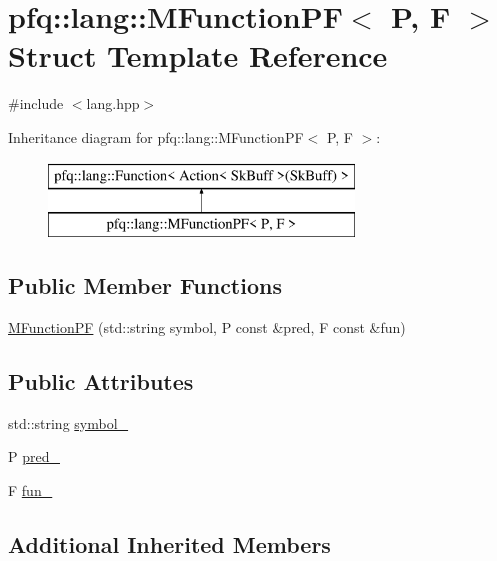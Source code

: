 \hypertarget{structpfq_1_1lang_1_1MFunctionPF}{\section{pfq\+:\+:lang\+:\+:M\+Function\+P\+F$<$ P, F $>$ Struct Template Reference}
\label{structpfq_1_1lang_1_1MFunctionPF}
}


{\ttfamily \#include $<$lang.\+hpp$>$}

Inheritance diagram for pfq\+:\+:lang\+:\+:M\+Function\+P\+F$<$ P, F $>$\+:\begin{figure}[H]
\begin{center}
\leavevmode
\includegraphics[height=2.000000cm]{structpfq_1_1lang_1_1MFunctionPF}
\end{center}
\end{figure}
\subsection*{Public Member Functions}
\begin{DoxyCompactItemize}
\item 
\hyperlink{structpfq_1_1lang_1_1MFunctionPF_a0da1abda6b3131cf6b6c4092b1186998}{M\+Function\+P\+F} (std\+::string symbol, P const \&pred, F const \&fun)
\end{DoxyCompactItemize}
\subsection*{Public Attributes}
\begin{DoxyCompactItemize}
\item 
std\+::string \hyperlink{structpfq_1_1lang_1_1MFunctionPF_a7481c170a22112aaca7c512e363e255a}{symbol\+\_\+}
\item 
P \hyperlink{structpfq_1_1lang_1_1MFunctionPF_a0a41a14e31e3a15b695dd876a58bf971}{pred\+\_\+}
\item 
F \hyperlink{structpfq_1_1lang_1_1MFunctionPF_aedde93be885b7e299495822596198996}{fun\+\_\+}
\end{DoxyCompactItemize}
\subsection*{Additional Inherited Members}


